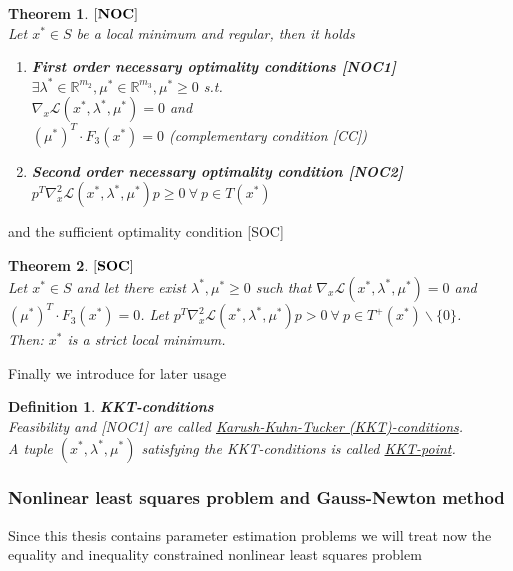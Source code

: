 \documentclass{scrartcl}[12pt, halfparskip]
\numberwithin{equation}{section}
\numberwithin{figure}{section}
\numberwithin{table}{section}
\newtheorem{Definition}{Definition}
\newtheorem{Theorem}{Theorem}
\begin{document}
\enlargethispage{2\baselineskip}

\begin{Theorem}
	$[\text{\textbf{NOC}}]$ \\
	Let $x^* \in S$ be a local minimum and regular, then it holds
	\begin{enumerate}
		\item \textbf{First order necessary optimality conditions [NOC1]} \\
		$\exists \lambda^* \in \mathbb{R}^{m_2}, \mu^* \in \mathbb{R}^{m_3}, \mu^* \ge 0$ s.t. \\
		$\nabla_x \mathcal{L}(x^*, \lambda^*, \mu^*) = 0$ and \\
		$(\mu^*)^T \cdot F_3(x^*) = 0$ (complementary condition [CC])
		\item \textbf{Second order necessary optimality condition [NOC2]} \\
		$p^T \nabla_x^2 \mathcal{L}(x^*, \lambda^*, \mu^*) p \ge 0 \ \forall \ p \in T(x^*)$
	\end{enumerate}
\end{Theorem}

and the sufficient optimality condition [SOC]

\begin{Theorem}
	$[\text{\textbf{SOC}}]$ \\
	Let $x^* \in S$ and let there exist $\lambda^*, \mu^* \ge 0$ such that $\nabla_x \mathcal{L}(x^*, \lambda^*, \mu^*) = 0$ and \\ $(\mu^*)^T \cdot F_3(x^*) = 0$. 
	Let $p^T \nabla_x^2 \mathcal{L}(x^*, \lambda^*, \mu^*) p > 0 \ \forall \ p \in T^+(x^*) \backslash \{0\}$. \\
	Then: $x^*$ is a strict local minimum.
\end{Theorem}

Finally we introduce for later usage 

\begin{Definition} \textbf{KKT-conditions} \\
	Feasibility and [NOC1] are called \underline{Karush-Kuhn-Tucker (KKT)-conditions}. \\
	A tuple $(x^*, \lambda^*, \mu^*)$ satisfying the KKT-conditions is called \underline{KKT-point}.
\end{Definition}


\subsubsection{Nonlinear least squares problem and Gauss-Newton method}
\label{sec:Gauss_Newton}
Since this thesis contains parameter estimation problems we will treat now the equality and inequality constrained nonlinear least squares problem
\end{document}
